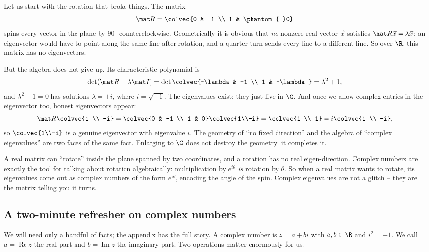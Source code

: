 Let us start with the rotation that broke things. The matrix
\[
  \mat R = \colvec{0 & -1 \\ 1 & \phantom{-}0}
\]
spins every vector in the plane by $90^\circ$ counterclockwise. Geometrically it
is obvious that \emph{no} nonzero real vector $\vec x$ satisfies $\mat R\vec x =
\lambda\vec x$: an eigenvector would have to point along the same line after
rotation, and a quarter turn sends every line to a different line. So over $\R$,
this matrix has no eigenvectors.

But the algebra does not give up. Its characteristic polynomial is
\[
  \det(\mat R - \lambda\mat I) = \det\colvec{-\lambda & -1 \\ 1 & -\lambda}
  = \lambda^2 + 1,
\]
and $\lambda^2+1=0$ has solutions $\lambda = \pm i$, where $i=\sqrt{-1}$. The
eigenvalues exist; they just live in $\C$. And once we allow complex entries in
the eigenvector too, honest eigenvectors appear:
\[
  \mat R \colvec{1 \\ -i} = \colvec{0 & -1 \\ 1 & 0}\colvec{1\\-i}
  = \colvec{i \\ 1} = i\colvec{1 \\ -i},
\]
so $\colvec{1\\-i}$ is a genuine eigenvector with eigenvalue $i$. The geometry of
``no fixed direction'' and the algebra of ``complex eigenvalues'' are two faces of
the same fact. Enlarging to $\C$ does not destroy the geometry; it completes it.

\begin{intuitionbox}
A real matrix can ``rotate'' inside the plane spanned by two coordinates, and a
rotation has no real eigen-direction. Complex numbers are exactly the tool for
talking about rotation algebraically: multiplication by $e^{i\theta}$ \emph{is}
rotation by $\theta$. So when a real matrix wants to rotate, its eigenvalues come
out as complex numbers of the form $e^{i\theta}$, encoding the angle of the spin.
Complex eigenvalues are not a glitch -- they are the matrix telling you it turns.
\end{intuitionbox}

\subsection{A two-minute refresher on complex numbers}

We will need only a handful of facts; the appendix has the full story. A complex
number is $z = a + bi$ with $a,b\in\R$ and $i^2=-1$. We call $a=\operatorname{Re}z$
the real part and $b=\operatorname{Im}z$ the imaginary part. Two operations matter
enormously for us.

